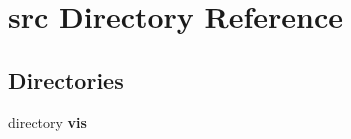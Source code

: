 \section{src Directory Reference}
\label{dir_96d553498d9584ffd97541c009cfd4b6}
\subsection*{Directories}
\begin{DoxyCompactItemize}
\item 
directory {\bf vis}
\end{DoxyCompactItemize}
